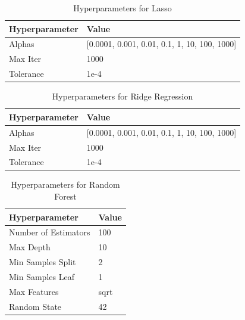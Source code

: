 \begin{table}[H]
\centering
\caption{Hyperparameters for Lasso}
\begin{tabular}{ll}
    \toprule
    \textbf{Hyperparameter} & \textbf{Value} \\
    \midrule
    Alphas & [0.0001, 0.001, 0.01, 0.1, 1, 10, 100, 1000] \\
    Max Iter & 1000 \\
    Tolerance & 1e-4 \\
    \bottomrule
\end{tabular}
\label{tab:lasso_hyperparameters}
\end{table}
\FloatBarrier

\begin{table}[H]
\centering
\caption{Hyperparameters for Ridge Regression}
\begin{tabular}{ll}
    \toprule
    \textbf{Hyperparameter} & \textbf{Value} \\
    \midrule
    Alphas & [0.0001, 0.001, 0.01, 0.1, 1, 10, 100, 1000] \\
    Max Iter & 1000 \\
    Tolerance & 1e-4 \\
    \bottomrule
\end{tabular}
\label{tab:ridge_hyperparameters}
\end{table}
\FloatBarrier

\begin{table}[H]
\centering
\caption{Hyperparameters for Random Forest}
\begin{tabular}{ll}
    \toprule
    \textbf{Hyperparameter} & \textbf{Value} \\
    \midrule
    Number of Estimators & 100 \\
    Max Depth & 10 \\
    Min Samples Split & 2 \\
    Min Samples Leaf & 1 \\
    Max Features & sqrt \\
    Random State & 42 \\
    \bottomrule
\end{tabular}
\label{tab:randomforest_hyperparameters}
\end{table}
\FloatBarrier

